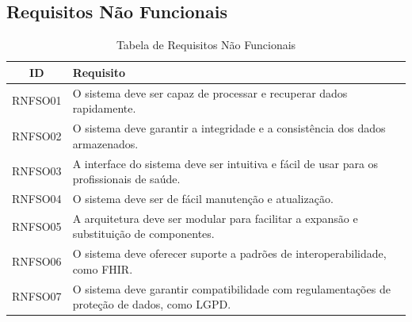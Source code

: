 \subsection{Requisitos Não Funcionais}
\begin{table}[H]
    \centering
    \begin{tabular}{|c|p{12cm}|}
    \hline
    \textbf{ID} & \textbf{Requisito} \\ \hline
    RNFSO01 & O sistema deve ser capaz de processar e recuperar dados rapidamente. \\ \hline
    RNFSO02 & O sistema deve garantir a integridade e a consistência dos dados armazenados. \\ \hline
    RNFSO03 & A interface do sistema deve ser intuitiva e fácil de usar para os profissionais de saúde. \\ \hline
    RNFSO04 & O sistema deve ser de fácil manutenção e atualização. \\ \hline
    RNFSO05 & A arquitetura deve ser modular para facilitar a expansão e substituição de componentes. \\ \hline
    RNFSO06 & O sistema deve oferecer suporte a padrões de interoperabilidade, como FHIR. \\ \hline
    RNFSO07 & O sistema deve garantir compatibilidade com regulamentações de proteção de dados, como LGPD. \\ \hline
    \end{tabular}
    \caption{Tabela de Requisitos Não Funcionais}
    \label{tab:requisitos_nao_funcionais}
\end{table}

